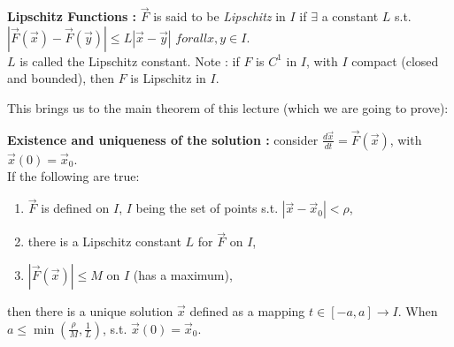 \begin{definition}
    \textbf{Lipschitz Functions :} $\vec{F}$ is said to be \textit{Lipschitz} in $I$ if $\exists$ a constant $L$ s.t. $|\vec{F}(\vec{x})-\vec{F}(\vec{y})| \leq L |\vec{x}-\vec{y}|$ $forall x,y \in I$. \\

    $L$ is called the Lipschitz constant. Note : if $F$ is $C^1$ in $I$, with $I$ compact (closed and bounded), then $F$ is Lipschitz in $I$.
\end{definition}

This brings us to the main theorem of this lecture (which we are going to prove):

\begin{theorem}
    \textbf{Existence and uniqueness of the solution :} consider $\frac{d\vec{x}}{dt} = \vec{F}(\vec{x})$, with $\vec{x}(0)= \vec{x}_0$. \\

    If the following are true:
    \begin{enumerate}[label=(\roman*)]
        \item  $\vec{F}$ is defined on $I$, $I$ being the set of points s.t. $|\vec{x} - \vec{x}_0|< \rho$,
        \item there is a Lipschitz constant $L$ for $\vec{F}$ on $I$,
        \item $|\vec{F}(\vec{x})| \leq M$ on $I$ (has a maximum),
    \end{enumerate}
    then there is a unique solution $\vec{x}$ defined as a mapping $t \in [-a,a] \rightarrow I$. When $a \leq \min \left( \frac{\rho}{M}, \frac{1}{L} \right)$, s.t. $\vec{x}(0)= \vec{x}_0$.
\end{theorem}


